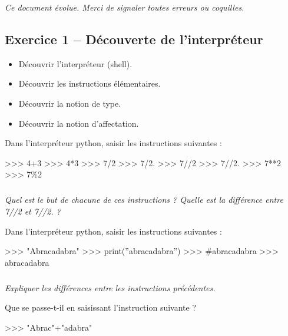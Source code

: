 \documentclass[10pt]{article}
\begin{document}
\setlength{\parskip}{0ex plus 0.2ex minus 0ex}
 \renewcommand{\contentsname}{}
 \renewcommand{\baselinestretch}{1}

\tableofcontents

 \renewcommand{\baselinestretch}{1.2}
\setlength{\parskip}{2ex plus 0.5ex minus 0.2ex}


\textit{Ce document évolue. Merci de signaler toutes erreurs ou coquilles.}



\subsection*{Exercice 1 -- Découverte de l'interpréteur}
\begin{obj}
\begin{itemize}
\item Découvrir l'interpréteur (\textsf{shell}).
\item Découvrir les instructions élémentaires.
\item Découvrir la notion de type.
\item Découvrir la notion d'affectation. 
\end{itemize}
\end{obj}



Dans l'interpréteur python, saisir les instructions suivantes :
\begin{py}
\begin{python}
>>> 4+3
>>> 4*3
>>> 7/2
>>> 7/2.
>>> 7//2
>>> 7//2.
>>> 7**2
>>> 7\%2
\end{python}
\end{py}

\subparagraph{}
\textit{Quel est le but de chacune de ces instructions ? Quelle est la différence entre \textsf{7//2} et \textsf{7//2.} ?}

Dans l'interpréteur python, saisir les instructions suivantes :
\begin{py}
\begin{python}
>>> "Abracadabra"
>>> print(''abracadabra'')
>>>  #abracadabra
>>>  abracadabra
\end{python}
\end{py}

\subparagraph{}
\textit{Expliquer les différences entre les instructions précédentes.}


\begin{rem}
Que se passe-t-il en saisissant l'instruction suivante ?
\begin{py}
\begin{python}
>>> "Abrac"+"adabra"
\end{python}
\end{py}
\end{rem}
\end{document}
